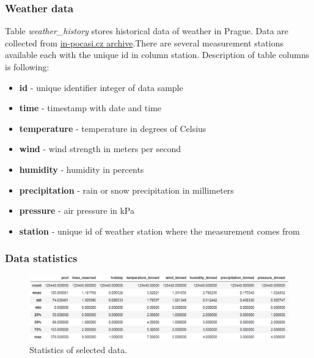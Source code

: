 \documentclass{article}
\begin{document}
\subsubsection{Weather data}
Table \emph{weather\_history} stores historical data of weather in Prague. Data are collected from \href{https://www.in-pocasi.cz/archiv/}{in-pocasi.cz archive}.There are several measurement stations
available each with the unique id in column station. Description of table columns is following:
\begin{itemize}
    \item \textbf{id} - unique identifier integer of data sample
    \item \textbf{time} - timestamp with date and time
    \item \textbf{temperature} - temperature in degrees of Celsius
    \item \textbf{wind} - wind strength in meters per second
    \item \textbf{humidity} - humidity in percents
    \item \textbf{precipitation} - rain or snow precipitation in millimeters
    \item \textbf{pressure} - air pressure in kPa
    \item \textbf{station} - unique id of weather station where the measurement comes from
\end{itemize}

\subsubsection{Data statistics}
\begin{figure}[h!]
\centering
\includegraphics[width=16cm]{imgs/stats.png}
\caption{Statistics of selected data.}
\label{fig:features_stats}
\end{figure}
\end{document}
